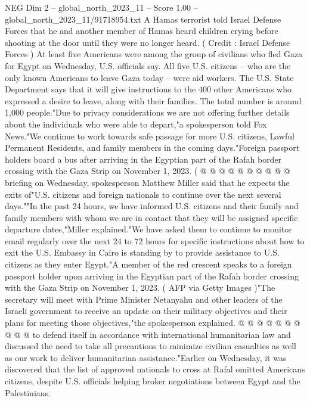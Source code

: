 \begin{textsample}{NEG Dim 2 – global\_north\_2023\_11 – Score 1.00 – global\_north\_2023\_11/91718954.txt}  \label{ex:f2_neg_138}
A Hamas terrorist told Israel Defense Forces that he and another member of Hamas heard children crying before shooting at the door until they were no longer heard. ( Credit : Israel Defense Forces ) At least five Americans were among the group of civilians who fled Gaza for Egypt on Wednesday, U.S. officials say.
All five U.S. citizens -- who are the only known Americans to leave Gaza today -- were aid workers.
The U.S.
State Department says that it will give instructions to the 400 other Americans who expressed a desire to leave, along with their families.
The total number is around 1,000 people."Due to privacy considerations we are not offering further details about the individuals who were able to depart,"a spokesperson told Fox News."We continue to work towards safe passage for more U.S. citizens, Lawful Permanent Residents, and family members in the coming days."Foreign passport holders board a bus after arriving in the Egyptian part of the Rafah border crossing with the Gaza Strip on November 1, 2023. ( @ @ @ @ @ @ @ @ @ @ briefing on Wednesday, spokesperson Matthew Miller said that he expects the exits of"U.S. citizens and foreign nationals to continue over the next several days.""In the past 24 hours, we have informed U.S. citizens and their family and family members with whom we are in contact that they will be assigned specific departure dates,"Miller explained."We have asked them to continue to monitor email regularly over the next 24 to 72 hours for specific instructions about how to exit the U.S.
Embassy in Cairo is standing by to provide assistance to U.S. citizens as they enter Egypt."A member of the red crescent speaks to a foreign passport holder upon arriving in the Egyptian part of the Rafah border crossing with the Gaza Strip on November 1, 2023. ( AFP via Getty Images )"The secretary will meet with Prime Minister Netanyahu and other leaders of the Israeli government to receive an update on their military objectives and their plans for meeting those objectives,"the spokesperson explained. @ @ @ @ @ @ @ @ @ @ to defend itself in accordance with international humanitarian law and discussed the need to take all precautions to minimize civilian casualties as well as our work to deliver humanitarian assistance."Earlier on Wednesday, it was discovered that the list of approved nationals to cross at Rafal omitted Americans citizens, despite U.S. officials helping broker negotiations between Egypt and the Palestinians.

\end{textsample}
